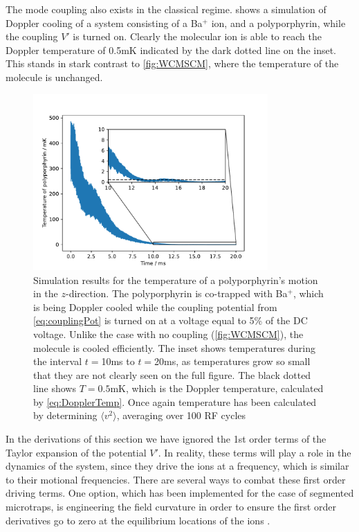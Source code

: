 The mode coupling also exists in the classical regime.  shows a simulation of Doppler cooling of a system consisting of a  Ba$^+$ ion, and a polyporphyrin, while the coupling $V'$ is turned on. Clearly the molecular ion is able to reach the Doppler temperature of 0.5mK indicated by the dark dotted line on the inset. This stands in stark contrast to \cref{fig:WCMSCM}, where the temperature of the molecule is unchanged.
\begin{figure}[h]
    \centering
    \includegraphics[width = 0.8\textwidth]{main/PolyPorCooling.pdf}
    \caption{Simulation results for the temperature of a polyporphyrin's motion in the $z$-direction. The polyporphyrin is co-trapped with Ba$^+$, which is being Doppler cooled while the coupling potential from \cref{eq:couplingPot} is turned on at a voltage equal to 5\% of the DC voltage. Unlike the case with no coupling (\cref{fig:WCMSCM}), the molecule is cooled efficiently.
    The inset shows temperatures during the interval $t = $10ms to $t = $20ms, as temperatures grow so small that they are not clearly seen on the full figure. The black dotted line shows $T = 0.5$mK, which is the Doppler temperature, calculated by \cref{eq:DopplerTemp}. Once again temperature has been calculated by determining $\langle v^2\rangle$, averaging over 100 RF cycles}
    \label{fig:polyPorCooling}
\end{figure}
\medskip
In the derivations of this section we have ignored the 1st order terms of the Taylor expansion of the potential $V'$. In reality, these terms will play a role in the dynamics of the system, since they drive the ions at a frequency, which is similar to their motional frequencies. There are several ways to combat these first order driving terms.
One option, which has been implemented for the case of segmented microtraps, is engineering the field curvature in order to ensure the first order derivatives go to zero at the equilibrium locations of the ions \cite{WeaklyCoupled}. 

